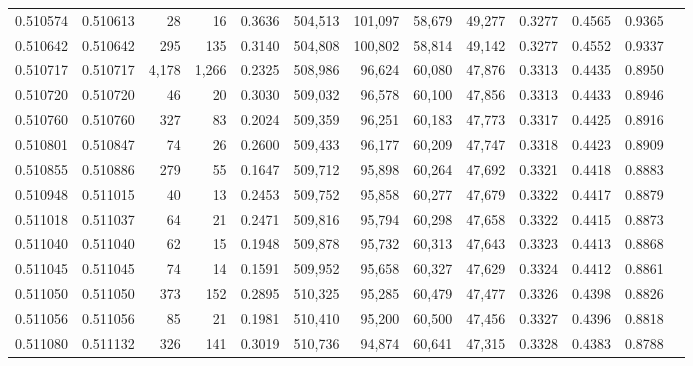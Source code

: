 \begin{tabular}{rrrrrrrrrrrrr}
0.510574 & 0.510613 &    28 &    16 &                                     0.3636 & 504,513 & 101,097 &  58,679 &  49,277 & 0.3277 & 0.4565 & 0.9365 \\
0.510642 & 0.510642 &   295 &   135 &                                     0.3140 & 504,808 & 100,802 &  58,814 &  49,142 & 0.3277 & 0.4552 & 0.9337 \\
0.510717 & 0.510717 & 4,178 & 1,266 &                                     0.2325 & 508,986 &  96,624 &  60,080 &  47,876 & 0.3313 & 0.4435 & 0.8950 \\
0.510720 & 0.510720 &    46 &    20 &                                     0.3030 & 509,032 &  96,578 &  60,100 &  47,856 & 0.3313 & 0.4433 & 0.8946 \\
0.510760 & 0.510760 &   327 &    83 &                                     0.2024 & 509,359 &  96,251 &  60,183 &  47,773 & 0.3317 & 0.4425 & 0.8916 \\
0.510801 & 0.510847 &    74 &    26 &                                     0.2600 & 509,433 &  96,177 &  60,209 &  47,747 & 0.3318 & 0.4423 & 0.8909 \\
0.510855 & 0.510886 &   279 &    55 &                                     0.1647 & 509,712 &  95,898 &  60,264 &  47,692 & 0.3321 & 0.4418 & 0.8883 \\
0.510948 & 0.511015 &    40 &    13 &                                     0.2453 & 509,752 &  95,858 &  60,277 &  47,679 & 0.3322 & 0.4417 & 0.8879 \\
0.511018 & 0.511037 &    64 &    21 &                                     0.2471 & 509,816 &  95,794 &  60,298 &  47,658 & 0.3322 & 0.4415 & 0.8873 \\
0.511040 & 0.511040 &    62 &    15 &                                     0.1948 & 509,878 &  95,732 &  60,313 &  47,643 & 0.3323 & 0.4413 & 0.8868 \\
0.511045 & 0.511045 &    74 &    14 &                                     0.1591 & 509,952 &  95,658 &  60,327 &  47,629 & 0.3324 & 0.4412 & 0.8861 \\
0.511050 & 0.511050 &   373 &   152 &                                     0.2895 & 510,325 &  95,285 &  60,479 &  47,477 & 0.3326 & 0.4398 & 0.8826 \\
0.511056 & 0.511056 &    85 &    21 &                                     0.1981 & 510,410 &  95,200 &  60,500 &  47,456 & 0.3327 & 0.4396 & 0.8818 \\
0.511080 & 0.511132 &   326 &   141 &                                     0.3019 & 510,736 &  94,874 &  60,641 &  47,315 & 0.3328 & 0.4383 & 0.8788 \\

\end{tabular}
